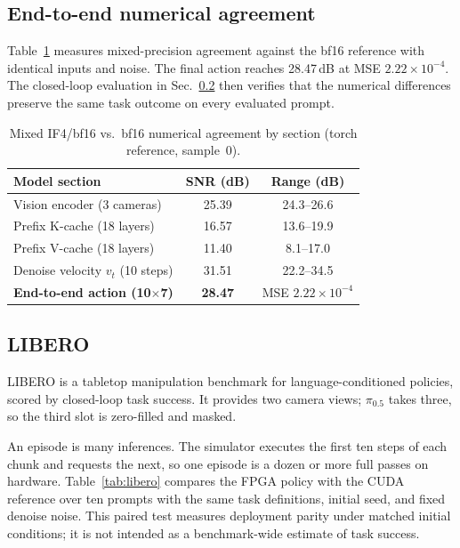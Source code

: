 \documentclass[11pt]{article}
\newcommand{\pizero}{$\pi_{0.5}$}
\newcommand{\iffour}{IF4}
\newcommand{\bfteen}{bf16}
\begin{document}
\subsection{End-to-end numerical agreement}
Table~\ref{tab:quant} measures mixed-precision agreement against the \bfteen{}
reference with identical inputs and noise. The final action reaches 28.47\,dB
at MSE $2.22{\times}10^{-4}$. The closed-loop evaluation in
Sec.~\ref{sec:libero} then verifies that the numerical differences preserve the
same task outcome on every evaluated prompt.

\begin{table}[H]
\centering\small
\caption{Mixed \iffour{}/\bfteen{} vs.\ \bfteen{} numerical agreement by
section (torch reference, sample~0).}
\label{tab:quant}
\begin{tabular}{@{}lcc@{}}
\toprule
\textbf{Model section} & \textbf{SNR (dB)} & \textbf{Range (dB)} \\
\midrule
Vision encoder (3 cameras)        & 25.39 & 24.3--26.6 \\
Prefix K-cache (18 layers)        & 16.57 & 13.6--19.9 \\
Prefix V-cache (18 layers)        & 11.40 & 8.1--17.0 \\
Denoise velocity $v_t$ (10 steps) & 31.51 & 22.2--34.5 \\
\midrule
\textbf{End-to-end action (10$\times$7)} & \textbf{28.47} & MSE $2.22{\times}10^{-4}$ \\
\bottomrule
\end{tabular}
\end{table}

\subsection{LIBERO}
\label{sec:libero}
LIBERO is a tabletop manipulation benchmark for language-conditioned policies,
scored by closed-loop task success. It provides two camera views; \pizero{}
takes three, so the third slot is zero-filled and masked.

An episode is many inferences. The simulator executes the first ten steps of
each chunk and requests the next, so one episode is a dozen or more full passes
on hardware. Table~\ref{tab:libero} compares the FPGA policy with the CUDA
reference over ten prompts with the same task definitions, initial seed, and
fixed denoise noise. This paired test measures deployment parity under matched
initial conditions; it is not intended as a benchmark-wide estimate of task
success.
\end{document}
